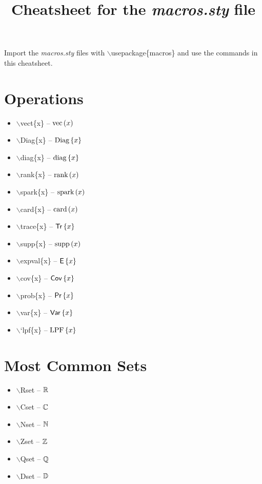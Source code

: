 \documentclass[twocolumn, a4paper]{article}
\title{Cheatsheet for the \textit{macros.sty} file}
\begin{document}
	\maketitle
	
	Import the \textit{macros.sty} files with $\backslash$usepackage\{macros\} and use the commands in this cheatsheet.
	
	
	
	\section{Operations}
	\begin{itemize}
	\item $\backslash$vect\{x\} -- $ \textrm{vec} \left( x \right) $ 
	\item $\backslash$Diag\{x\} -- $ \textrm{Diag} \left\lbrace x \right\rbrace $ 
	\item $\backslash$diag\{x\} -- $ \textrm{diag} \left\lbrace x \right\rbrace $ 
	\item $\backslash$rank\{x\} -- $ \textrm{rank} \left( x \right) $ 
	\item $\backslash$spark\{x\} -- $ \textrm{spark}\left( x \right) $ 
	\item $\backslash$card\{x\} -- $ \textrm{card} \left( x \right) $
	\item $\backslash$trace\{x\} -- $ \mathsf{Tr} \left\lbrace x \right\rbrace $
	\item $\backslash$supp\{x\} -- $ \textrm{supp} \left( x \right) $
	\item $\backslash$expval\{x\} -- $ \mathsf{E} \left\lbrace x \right\rbrace $
	\item $\backslash$cov\{x\} -- $ \mathsf{Cov} \left\lbrace x \right\rbrace $
	\item $\backslash$prob\{x\} -- $ \mathsf{Pr} \left\lbrace x \right\rbrace $
	\item $\backslash$var\{x\} -- $ \mathsf{Var} \left\lbrace x \right\rbrace $
	\item $\backslash$`lpf\{x\} -- $ \mathrm{LPF} \left\lbrace x \right\rbrace $
	\end{itemize}
	
	\section{Most Common Sets}
	\begin{itemize}
		\item $\backslash$Rset -- $\mathbb{R}$ 
		\item $\backslash$Cset -- $\mathbb{C}$ 
		\item $\backslash$Nset -- $\mathbb{N}$ 
		\item $\backslash$Zset -- $\mathbb{Z}$ 
		\item $\backslash$Qset -- $\mathbb{Q}$ 
		\item $\backslash$Dset -- $\mathbb{D}$ 
	\end{itemize}
\end{document}
